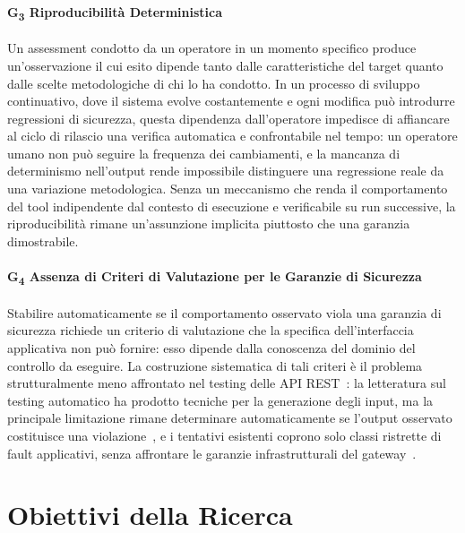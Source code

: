 \paragraph{G\textsubscript{3} Riproducibilità Deterministica}\label{g3:riproducibilita}
Un assessment condotto da un operatore in un momento specifico produce un'osservazione il cui esito dipende tanto dalle caratteristiche del target quanto dalle scelte metodologiche di chi lo ha condotto. In un processo di sviluppo continuativo, dove il sistema evolve costantemente e ogni modifica può introdurre regressioni di sicurezza, questa dipendenza dall'operatore impedisce di affiancare al ciclo di rilascio una verifica automatica e confrontabile nel tempo: un operatore umano non può seguire la frequenza dei cambiamenti, e la mancanza di determinismo nell'output rende impossibile distinguere una regressione reale da una variazione metodologica. Senza un meccanismo che renda il comportamento del tool indipendente dal contesto di esecuzione e verificabile su run successive, la riproducibilità rimane un'assunzione implicita piuttosto che una garanzia dimostrabile.


\paragraph{G\textsubscript{4} Assenza di Criteri di Valutazione per le Garanzie di Sicurezza}\label{g4:assenza-oracoli}
Stabilire automaticamente se il comportamento osservato viola una garanzia di sicurezza richiede un criterio di valutazione che la specifica dell'interfaccia applicativa non può fornire: esso dipende dalla conoscenza del dominio del controllo da eseguire. La costruzione sistematica di tali criteri è il problema strutturalmente meno affrontato nel testing delle \gls{API} REST~\cite{golmohammadiTestingRESTfulAPIs2023}: la letteratura sul testing automatico ha prodotto tecniche per la generazione degli input, ma la principale limitazione rimane determinare automaticamente se l'output osservato costituisce una violazione~\cite{barrOracleProblemSoftware2015}, e i tentativi esistenti coprono solo classi ristrette di fault applicativi, senza affrontare le garanzie infrastrutturali del gateway~\cite{sahinEnhancingRESTAPI2026}.

\section{Obiettivi della Ricerca}\label{sec:obiettivi}

